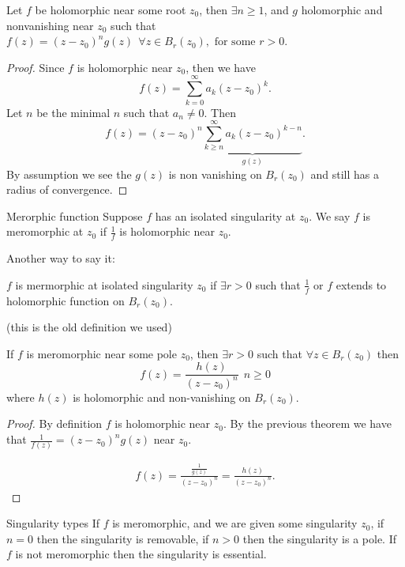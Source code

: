 \documentclass{article}
\begin{document}
\begin{thrm}{}{}
Let \( f \) be holomorphic near some root \( z_0 \), then \( \exists  n\geq 1 \), and \( g \) holomorphic and nonvanishing near \( z_0 \) such that \( f(z) = (z - z_0)^n g(z) \ \ \forall z \in B_r(z_0), \text{ for some } r> 0 \). 
\tcbline
\begin{proof}
Since \( f \) is holomorphic near \( z_0 \), then we have 
\[
    f(z) = \sum_{k= 0}^{\infty} a_{k} (z - z_0)^k. 
\]
Let \( n \) be the minimal \( n \) such that \( a_{n} \neq 0 \). 
Then 
\[
  f(z) = (z - z_0)^n \underbrace{\sum_{k\geq n}^{\infty}   a_{k} (z - z_{0} )^{k- n} }_{g(z)}.
\] 
By assumption we see the \( g(z) \) is non vanishing on \( B_{r} (z_0) \) and still has a radius of convergence. 
\end{proof}

\end{thrm}
\begin{defn}{Merorphic function}{}
Suppose \( f \) has an isolated singularity at \( z_0 \). We say  \( f \) is meromorphic at \( z_0 \) if \( \frac{1}{f} \) is holomorphic near \( z_0 \). 

Another way to say it:

\( f \) is mermorphic at isolated singularity \( z_{0}  \) if \( \exists r>0 \) such that \( \frac{1}{f} \) or \( f \) extends to holomorphic function on \( B_r(z_0) \). 

(this is the old definition we used)
\end{defn}

\begin{thrm}{}{}
If \(f \) is meromorphic near some pole \( z_0 \), then \( \exists r>0  \) such that \( \forall z \in B_{r} (z_0) \) then
\[
    f(z) = \frac{h(z)}{(z - z_0)^n} \ \ n\geq 0
\]
where \( h(z) \) is holomorphic and non-vanishing on \( B_{r} (z_0) \). 
\tcbline
\begin{proof}
By definition \( f \) is holomorphic near \( z_0 \). By the previous theorem we have that \(\frac{1}{f(z)}  = (z - z_0)^n g(z)\) near \( z_0 \). 

\begin{align*}
    f(z) = \frac{\frac{1}{g(z)} }{(z - z_0)^n} = \frac{h(z)}{(z - z_0)^n}.
\end{align*}

\end{proof}

\end{thrm}


 \begin{defn}{Singularity types}{}
 If \( f \) is meromorphic, and we are given some singularity \( z_0 \), if \( n = 0 \) then the singularity is removable, if \( n>0 \) then the singularity is a pole. If \( f \) is not meromorphic then the singularity is essential. 
 \end{defn}
 
\end{document}
